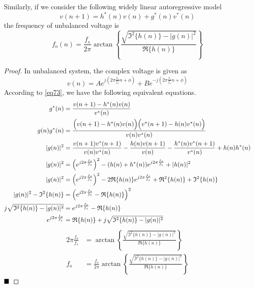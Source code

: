 \documentclass[10pt]{article}
\newtheorem*{proof}{Proof}[section]
\begin{document}
Similarly, if we consider the following widely linear autoregressive model 
\begin{equation}
	v(n+1) = h^*(n) v(n) + g^*(n) v^*(n) \label{eq73}
\end{equation}
the frequency of unbalanced voltage is 
\begin{equation}
	f_o(n) = \frac{f_s}{2\pi} \arctan \left\{  \frac{ \sqrt{\mathfrak{I}^2\{ h(n) \} - |g(n)|^2 } }{\mathfrak{R}\{ h(n) \}} \right\} \label{eq74}
\end{equation}

\begin{proof}
	In unbalanced system, the complex voltage is given as 
	\begin{equation}
		v(n) = A e^{ j \left( 2\pi \frac{f_o}{f_s} n + \phi \right) } + B e^{ -j \left( 2\pi \frac{f_o}{f_s} n + \phi \right) }
	\end{equation}
	According to \eqref{eq73}, we have the following equivalent equations.
	\begin{align}
		g^*(n) &= \frac{v(n+1) - h^*(n)v(n)}{v^*(n)} \\
		g(n) g^*(n) &= \frac{\Bigl(v(n+1) - h^*(n)v(n)\Bigl) \Bigl(v^*(n+1) - h(n)v^*(n)\Bigl)}{v(n) v^*(n)} \\
		|g(n)|^2 &= \frac{v(n+1) v^*(n+1)}{v(n) v^*(n)} - \frac{h(n) v(n+1)}{v(n)} - \frac{h^*(n) v^*(n+1)}{v^*(n)} + h(n)h^*(n) \\
		|g(n)|^2 &= \left( e^{ j 2\pi \frac{f_o}{f_s} } \right)^2 - (h(n) + h^*(n))e^{ j 2\pi \frac{f_o}{f_s} } + |h(n)|^2 \\
		|g(n)|^2 &= \left( e^{ j 2\pi \frac{f_o}{f_s} } \right)^2 - 2 \mathfrak{R}\{ h(n) \} e^{ j 2\pi \frac{f_o}{f_s} } + \mathfrak{R}^2\{ h(n) \} + \mathfrak{I}^2\{ h(n) \} \\
		|g(n)|^2 - \mathfrak{I}^2\{ h(n) \} &= \left( e^{ j 2\pi \frac{f_o}{f_s} } - \mathfrak{R}\{ h(n) \} \right)^2 \\
		j \sqrt{ \mathfrak{I}^2\{ h(n) \} - |g(n)|^2 } &= e^{ j 2\pi \frac{f_o}{f_s} } - \mathfrak{R}\{ h(n) \} \\
		e^{ j 2\pi \frac{f_o}{f_s} } &= \mathfrak{R}\{ h(n) \} + j \sqrt{ \mathfrak{I}^2\{ h(n) \} - |g(n)|^2 }
	\end{align}
	\begin{align}
		2\pi \frac{f_o}{f_s} &= \arctan \left\{ \frac{ \sqrt{ \mathfrak{I}^2\{ h(n) \} - |g(n)|^2 } }{ \mathfrak{R}\{ h(n) \} } \right\} \\
		f_o &= \frac{f_s}{2\pi} \arctan \left\{ \frac{ \sqrt{ \mathfrak{I}^2\{ h(n) \} - |g(n)|^2 } }{ \mathfrak{R}\{ h(n) \} } \right\}
	\end{align}
	$\hfill\blacksquare$ 
\end{proof}
\end{document}
